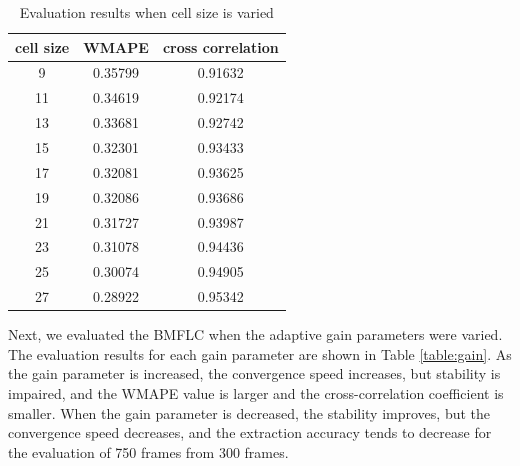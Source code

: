 \begin{table}[tb]
 \centering
 \caption{Evaluation results when cell size is varied}
 \label{table:cell_size}
 \begin{tabular}{|c|c|c|}
   \hline
   cell size & WMAPE &cross correlation \\ \hline \hline
   9         &0.35799  &0.91632       \\ \hline
   11        &0.34619  &0.92174 \\ \hline
   13        &0.33681  &0.92742 \\ \hline
   15        &0.32301  &0.93433  \\ \hline
   17        &0.32081  &0.93625  \\ \hline
   19        &0.32086  &0.93686   \\ \hline
   21        &0.31727  &0.93987  \\ \hline
   23        &0.31078  &0.94436   \\ \hline
   25        &0.30074  &0.94905   \\ \hline
   27        &0.28922  &0.95342 \\ \hline
 \end{tabular}
\end{table}





Next, we evaluated the BMFLC when the adaptive gain parameters were varied.
The evaluation results for each gain parameter are shown in Table \ref{table:gain}.
As the gain parameter is increased, the convergence speed increases, but stability is impaired,
and the WMAPE value is larger and the cross-correlation coefficient is smaller.
When the gain parameter is decreased, the stability improves, but the convergence speed decreases,
and the extraction accuracy tends to decrease for the evaluation of 750 frames from 300 frames.


